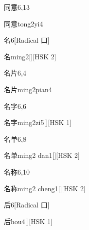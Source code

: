 \begin{entry}{同意}{6,13}
  \begin{phonetics}{同意}{tong2yi4}
  \end{phonetics}
\end{entry}

\begin{entry}{名}{6}[Radical 口]
  \begin{phonetics}{名}{ming2}[][HSK 2]
  \end{phonetics}
\end{entry}

\begin{entry}{名片}{6,4}
  \begin{phonetics}{名片}{ming2pian4}
  \end{phonetics}
\end{entry}

\begin{entry}{名字}{6,6}
  \begin{phonetics}{名字}{ming2zi5}[][HSK 1]
  \end{phonetics}
\end{entry}

\begin{entry}{名单}{6,8}
  \begin{phonetics}{名单}{ming2 dan1}[][HSK 2]
  \end{phonetics}
\end{entry}

\begin{entry}{名称}{6,10}
  \begin{phonetics}{名称}{ming2 cheng1}[][HSK 2]
  \end{phonetics}
\end{entry}

\begin{entry}{后}{6}[Radical 口]
  \begin{phonetics}{后}{hou4}[][HSK 1]
  \end{phonetics}
\end{entry}

